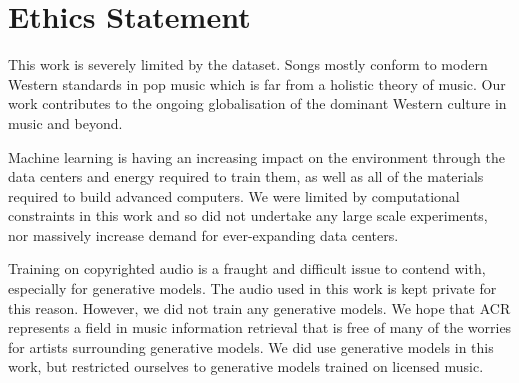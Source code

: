 



\section{Ethics Statement}\label{sec:ethics-statement}

This work is severely limited by the dataset. Songs mostly conform to modern Western standards in pop music which is far from a holistic theory of music. Our work contributes to the ongoing globalisation of the dominant Western culture in music and beyond.

Machine learning is having an increasing impact on the environment through the data centers and energy required to train them, as well as all of the materials required to build advanced computers. We were limited by computational constraints in this work and so did not undertake any large scale experiments, nor massively increase demand for ever-expanding data centers.

Training on copyrighted audio is a fraught and difficult issue to contend with, especially for generative models. The audio used in this work is kept private for this reason. However, we did not train any generative models. We hope that ACR represents a field in music information retrieval that is free of many of the worries for artists surrounding generative models. We did use generative models in this work, but restricted ourselves to generative models trained on licensed music.